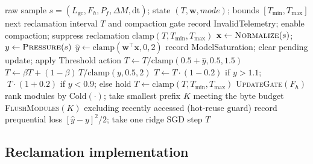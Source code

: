 \documentclass[acmsmall,screen]{acmart}
\begin{document}
\begin{algorithm}[t]
\caption{SAGE-MM controller decision for one interval. Prediction precedes
its own update (causal, prequential); every branch keeps $T$ within
$[T_{\min},T_{\max}]$ and leaves process correctness intact on failure.}
\label{alg:controller}
\small
\begin{algorithmic}[1]
\Require raw sample $s=(L_{\mathrm{gc}},F_h,P_f,\Delta M,\mathrm{dt})$; state
$(T,\mathbf{w},\textit{mode})$; bounds $[T_{\min},T_{\max}]$
\Ensure next reclamation interval $T$ and compaction gate
  \State record \textsf{InvalidTelemetry}; enable compaction; suppress reclamation
  \State \Return $\mathrm{clamp}(T,T_{\min},T_{\max})$ 
\EndIf
\State $\mathbf{x}\gets\textsc{Normalize}(s)$; \quad $y\gets\textsc{Pressure}(s)$ 
  \State $\hat{y}\gets\mathrm{clamp}(\mathbf{w}^{\!\top}\mathbf{x},0,2)$
    \State record \textsf{ModelSaturation}; clear pending update; apply \textsf{Threshold} action
  \Else
    \State $T\gets T/\mathrm{clamp}(0.5+\hat{y},0.5,1.5)$
  \EndIf
{}
  \State $T\gets \beta T+(1-\beta)\,T/\mathrm{clamp}(y,0.5,2)$
  \State $T\gets T\cdot(1-0.2)$ if $y>1.1$; $\;T\cdot(1+0.2)$ if $y<0.9$; else hold
\EndIf
\State $T\gets\mathrm{clamp}(T,T_{\min},T_{\max})$
\State \textsc{UpdateGate}$(F_h)$ 
  \State rank modules by $\mathrm{Cold}(\cdot)$; take smallest prefix $K$ meeting the byte budget
  \State \textsc{FlushModules}$(K)$ excluding recently accessed (hot-reuse guard)
\EndIf
{}
  \State record prequential loss $[\hat{y}-y]^2/2$; take one ridge SGD step 
\EndIf
\State \Return $T$
\end{algorithmic}
\end{algorithm}

\subsection{Reclamation implementation}
\label{sec:reclaim}
\end{document}
